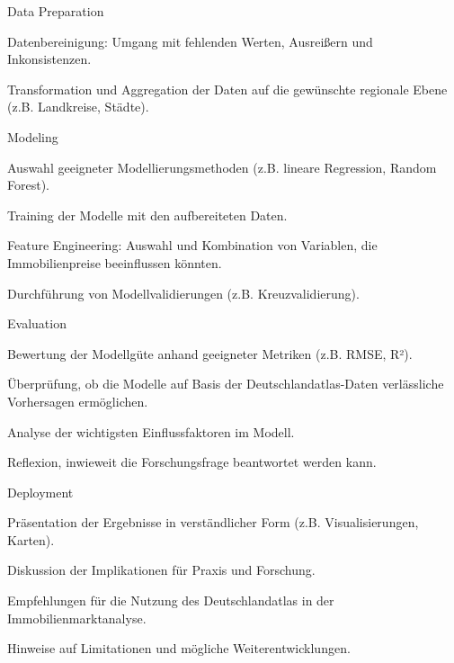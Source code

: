 Data Preparation

    Datenbereinigung: Umgang mit fehlenden Werten, Ausreißern und Inkonsistenzen.

    Transformation und Aggregation der Daten auf die gewünschte regionale Ebene (z.B. Landkreise, Städte).

Modeling

    Auswahl geeigneter Modellierungsmethoden (z.B. lineare Regression, Random Forest).

    Training der Modelle mit den aufbereiteten Daten.

    Feature Engineering: Auswahl und Kombination von Variablen, die Immobilienpreise beeinflussen könnten.

    Durchführung von Modellvalidierungen (z.B. Kreuzvalidierung).

Evaluation

    Bewertung der Modellgüte anhand geeigneter Metriken (z.B. RMSE, R²).

    Überprüfung, ob die Modelle auf Basis der Deutschlandatlas-Daten verlässliche Vorhersagen ermöglichen.

    Analyse der wichtigsten Einflussfaktoren im Modell.

    Reflexion, inwieweit die Forschungsfrage beantwortet werden kann.

Deployment

    Präsentation der Ergebnisse in verständlicher Form (z.B. Visualisierungen, Karten).

    Diskussion der Implikationen für Praxis und Forschung.

    Empfehlungen für die Nutzung des Deutschlandatlas in der Immobilienmarktanalyse.

    Hinweise auf Limitationen und mögliche Weiterentwicklungen.
